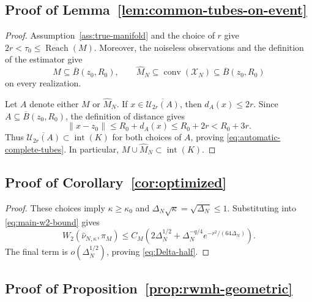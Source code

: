 \documentclass{article}
\newcommand{\Reach}{\operatorname{Reach}}
\newcommand{\cU}{\mathcal U}
\newcommand{\wideM}{\widehat M_N}
\newcommand{\whatnu}{\widehat\nu_{N,\kappa}}
\numberwithin{equation}{section}
\begin{document}
\subsection{Proof of Lemma~\ref{lem:common-tubes-on-event}}



\begin{proof}
Assumption~\ref{ass:true-manifold} and the choice of $r$ give
$2r<\tau_0\le\Reach(M)$. Moreover, the noiseless observations and the
definition of the estimator give
\[
 M\subseteq\overline B(z_0,R_0),
 \qquad
 \wideM\subseteq\operatorname{conv}(\mathcal X_N)
 \subseteq\overline B(z_0,R_0)
\]
on every realization.

Let $A$ denote either $M$ or $\wideM$. If
$x\in\overline{\cU_{2r}(A)}$, then $d_A(x)\le2r$. Since
$A\subseteq\overline B(z_0,R_0)$, the definition of distance gives
\[
 \lVert x-z_0\rVert
 \le R_0+d_A(x)
 \le R_0+2r<R_0+3r.
\]
Thus $\overline{\cU_{2r}(A)}\subset\operatorname{int}(K)$ for both choices
of $A$, proving \eqref{eq:automatic-complete-tubes}. In particular,
$M\cup\wideM\subset\operatorname{int}(K)$.
\end{proof}



\subsection{Proof of Corollary~\ref{cor:optimized}}



\begin{proof}
These choices imply $\kappa\ge\kappa_0$ and
$\Delta_N\sqrt\kappa=\sqrt{\Delta_N}\le1$.
Substituting into \eqref{eq:main-w2-bound} gives
\[
 W_2(\whatnu,\pi_M)
 \le C_M\left(
 2\Delta_N^{1/2}
 +\Delta_N^{-q/4}e^{-r^2/(64\Delta_N)}
 \right).
\]
The final term is $o(\Delta_N^{1/2})$, proving
\eqref{eq:Delta-half}.
\end{proof}



\subsection{Proof of Proposition~\ref{prop:rwmh-geometric}}
\end{document}
